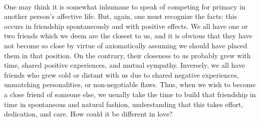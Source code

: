 \documentclass[a4paper, 12pt]{article}
\begin{document}
~ 

One may think it is somewhat inhumane to speak of competing for primacy in
another person's affective life. But, again, one must recognize the facts: this
occurs in friendship spontaneously and with positive effects. We all have one or 
two friends which we deem are the closest to us, and it is obvious that they have 
not become so close by virtue of axiomatically assuming we should have placed them 
in that position. On the contrary, their closeness to us probably grew with time,
shared positive experiences, and mutual sympathy. Inversely, we all have friends who 
grew cold or distant with us due to shared negative experiences, unmatching personalities,
or non-negotiable flaws. Thus, when we wish to become a close friend of someone else, we 
usually take the time to build that friendship in time in spontaneous and natural fashion,
understanding that this takes effort, dedication, and care. How could it be different in love?
\end{document}
